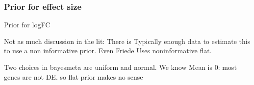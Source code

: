 
\subsubsection{Prior for  effect size}
Prior for logFC

Not as much discussion in the lit:
There is Typically enough data to estimate this to use a non informative prior.
Even Friede Uses noninformative flat.

Two choices in bayesmeta are uniform and normal.
We know Mean is 0: most genes are not DE.
so flat prior makes no sense

